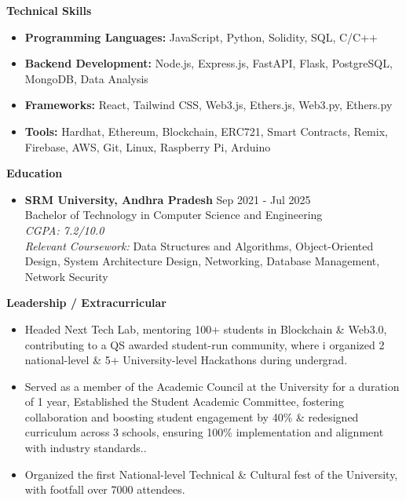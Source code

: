 \documentclass{article}
\newcommand{\resumesection}[1]{\vspace{0.2pt}\noindent\textbf{#1}}
\begin{document}
\resumesection{Technical Skills}

\noindent\makebox[\linewidth]{\rule{\textwidth}{0.4pt}}

\begin{itemize}[leftmargin=*]
    \item \textbf{Programming Languages:}  JavaScript, Python, Solidity, SQL, C/C++
    \item \textbf{Backend Development:} Node.js, Express.js, FastAPI, Flask, PostgreSQL, MongoDB, Data Analysis
    \item \textbf{Frameworks:} React, Tailwind CSS, Web3.js, Ethers.js, Web3.py, Ethers.py
    \item \textbf{Tools:} Hardhat, Ethereum, Blockchain, ERC721, Smart Contracts, Remix, Firebase, AWS, Git, Linux, Raspberry Pi, Arduino
\end{itemize}


\resumesection{Education}

\noindent\makebox[\linewidth]{\rule{\textwidth}{0.4pt}}


\begin{itemize}[leftmargin=*]
    \item \textbf{SRM University, Andhra Pradesh} \hfill Sep 2021 - Jul 2025 \\
    Bachelor of Technology in Computer Science and Engineering \\
    \textit{CGPA: 7.2/10.0} \\
    \textit{Relevant Coursework:} Data Structures and Algorithms, Object-Oriented Design, System Architecture Design, Networking, Database Management, Network Security
\end{itemize}
\resumesection{Leadership / Extracurricular}

\noindent\makebox[\linewidth]{\rule{\textwidth}{0.4pt}}


\begin{itemize}[leftmargin=*]
    \item Headed Next Tech Lab, mentoring 100+ students in Blockchain \& Web3.0, contributing to a QS awarded student-run community, where i organized 2 national-level \& 5+ University-level Hackathons during undergrad.
    \item Served as a member of the Academic Council at the University for a duration of 1 year, Established the Student Academic Committee, fostering collaboration and boosting student engagement by 40\% \& redesigned curriculum across 3 schools, ensuring 100\% implementation and alignment with industry standards..
    \item Organized the first National-level Technical \& Cultural fest of the University, with footfall over 7000 attendees.
\end{itemize}
\end{document}
